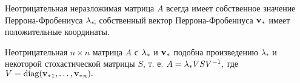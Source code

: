 \begin{ttt}
\label{T-Perr_Fro}
Неотрицательная неразложимая матрица $A$ всегда имеет собственное значение Перрона-Фробениуса ${\lambda_\ast}\!$; собственный вектор Перрона-Фробениуса ${\mathbf{v}_\ast}$ имеет положительные координаты.
\end{ttt}

\begin{col}
\label{NEOTR_V_STOCH}
Неотрицательная $n \times n$ матрица $A$ с ${\lambda_\ast}$ и ${\mathbf{v}_\ast}$ подобна произведению $\lambda_\ast$ и некоторой стохастической матрицы $S$, т. е. $A = {\lambda_\ast} VSV^{-1},$ где $V = \mathop{\rm diag}\nolimits({\mathbf{v}_\ast}_1, \ldots, {\mathbf{v}_\ast}_n).$
\end{col}

\clearpage